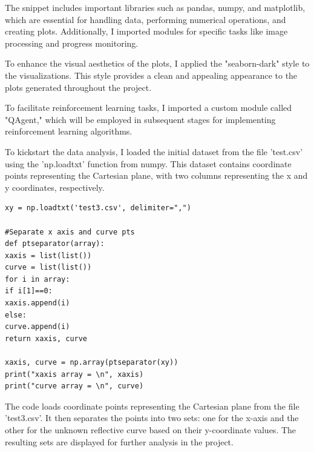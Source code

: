 \documentclass[12pt,a4paper,twoside]{report}
\begin{document}
The snippet includes important libraries such as pandas, numpy, and matplotlib, which are essential for handling data, performing numerical operations, and creating plots. Additionally, I imported modules for specific tasks like image processing and progress monitoring.

To enhance the visual aesthetics of the plots, I applied the "seaborn-dark" style to the visualizations. This style provides a clean and appealing appearance to the plots generated throughout the project.

To facilitate reinforcement learning tasks, I imported a custom module called "QAgent," which will be employed in subsequent stages for implementing reinforcement learning algorithms.

To kickstart the data analysis, I loaded the initial dataset from the file 'test.csv' using the 'np.loadtxt' function from numpy. This dataset contains coordinate points representing the Cartesian plane, with two columns representing the x and y coordinates, respectively.

\begin{lstlisting}
xy = np.loadtxt('test3.csv', delimiter=",")

#Separate x axis and curve pts 
def ptseparator(array):
xaxis = list(list())
curve = list(list())
for i in array:
if i[1]==0:
xaxis.append(i)
else:
curve.append(i)
return xaxis, curve  

xaxis, curve = np.array(ptseparator(xy))
print("xaxis array = \n", xaxis)
print("curve array = \n", curve)
\end{lstlisting}

The code loads coordinate points representing the Cartesian plane from the file 'test3.csv'. It then separates the points into two sets: one for the x-axis and the other for the unknown reflective curve based on their y-coordinate values. The resulting sets are displayed for further analysis in the project.
\end{document}
